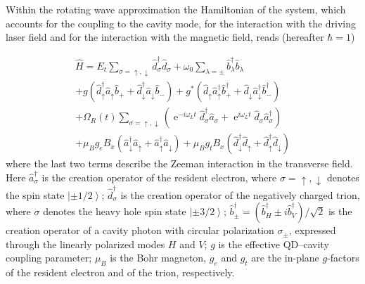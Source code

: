 \documentclass[prb,twocolumn,preprintnumbers,superscriptaddress]{revtex4-2}
\DeclareMathOperator{\e}{e}
\begin{document}
Within the rotating wave approximation the Hamiltonian of the system, which
accounts for the coupling to the cavity mode, for the interaction with the
driving laser field and for the interaction with the magnetic field, reads
(hereafter $\hbar = 1$)

\begin{gather}
    \hat{H} = E_t \sum_{\sigma = \uparrow, \downarrow} \hat{d}^{\dag}_{\sigma} \hat{d}_{\sigma}
    + \omega_0 \sum_{\lambda = \pm} \hat{b}^{\dag}_{\lambda} \hat{b}_{\lambda}
    \\ \nonumber
    + g \left( \hat{d}^{\dag}_{\uparrow} \hat{a}_{\uparrow} \hat{b}_{+}
    + \hat{d}^{\dag}_{\downarrow} \hat{a}_{\downarrow} \hat{b}_{-} \right)
    + g^{*} \left( \hat{d}_{\uparrow} \hat{a}^{\dag}_{\uparrow} \hat{b}^{\dag}_{+}
    + \hat{d}_{\downarrow} \hat{a}^{\dag}_{\downarrow} \hat{b}^{\dag}_{-} \right)
    \\ \nonumber
    + \Omega_R(t) \sum_{\sigma = \uparrow, \downarrow}
    \left( \e^{-i \omega_L t} \hat{d}^{\dag}_{\sigma} \hat{a}_{\sigma}
    + \e^{i \omega_L t} \hat{d}_{\sigma} \hat{a}^{\dag}_{\sigma} \right)
    \\ \nonumber
    + \mu_B g_e B_x \left( \hat{a}^{\dag}_{\downarrow} \hat{a}_{\uparrow}
    + \hat{a}^{\dag}_{\uparrow} \hat{a}_{\downarrow} \right)
    + \mu_B g_t B_x \left( \hat{d}^{\dag}_{\downarrow} \hat{d}_{\uparrow}
    + \hat{d}^{\dag}_{\uparrow} \hat{d}_{\downarrow} \right)
    \label{eq:hamiltonian}
\end{gather}
where the last two terms describe the Zeeman interaction in the transverse field.
Here $\hat{a}^{\dag}_{\sigma}$ is the creation operator of the resident electron,
where $\sigma = \uparrow, \downarrow$ denotes the spin state $\left| \pm 1/2 \right>$;
$\hat{d}^{\dag}_{\sigma}$ is the creation operator of the negatively charged trion,
where $\sigma$ denotes the heavy hole spin state $\left| \pm 3/2 \right>$;
$\hat{b}^{\dag}_{\pm} = ( \hat{b}^{\dag}_{H} \pm i \hat{b}^{\dag}_{V} ) / \sqrt{2}$
is the creation operator of a cavity photon with circular polarization $\sigma_{\pm}$,
expressed through the linearly polarized modes $H$ and $V$;
$g$ is the effective QD--cavity coupling parameter;
$\mu_B$ is the Bohr magneton, $g_e$ and $g_t$ are the in-plane $g$-factors of the
resident electron and of the trion, respectively.
\end{document}

